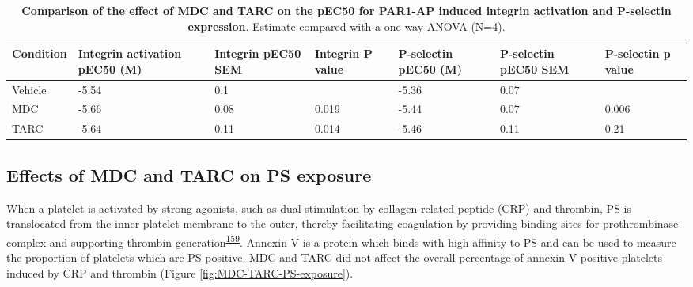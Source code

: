 \documentclass[11pt,twoside]{bristolthesis}
\begin{document}
\begin{table}

\caption[Comparison of the effect of MDC and TARC on the pEC50 for PAR1-AP induced integrin activation and P-selectin expression]{\label{tab:chemokines-integrin-pselectin}\textbf{Comparison of the effect of MDC and TARC on the pEC50 for PAR1-AP induced integrin activation and P-selectin expression}. Estimate compared with a one-way ANOVA (N=4).}
\centering
\fontsize{9}{11}\selectfont
\begin{tabu} to 
\toprule
Condition & Integrin activation pEC50 (M) & Integrin pEC50 SEM & Integrin P value & P-selectin pEC50 (M) & P-selectin pEC50 SEM & P-selectin p value\\
\midrule
Vehicle & -5.54 & 0.1 &  & -5.36 & 0.07 & \\
MDC & -5.66 & 0.08 & 0.019 & -5.44 & 0.07 & 0.006\\
TARC & -5.64 & 0.11 & 0.014 & -5.46 & 0.11 & 0.21\\
\bottomrule
\end{tabu}
\end{table}
\hypertarget{effects-of-mdc-and-tarc-on-ps-exposure}{%
\subsection{Effects of MDC and TARC on PS exposure}\label{effects-of-mdc-and-tarc-on-ps-exposure}}

When a platelet is activated by strong agonists, such as dual stimulation by collagen-related peptide (CRP) and thrombin, PS is translocated from the inner platelet membrane to the outer, thereby facilitating coagulation by providing binding sites for prothrombinase complex and supporting thrombin generation\textsuperscript{\protect\hyperlink{ref-Reddy2020}{159}}. Annexin V is a protein which binds with high affinity to PS and can be used to measure the proportion of platelets which are PS positive. MDC and TARC did not affect the overall percentage of annexin V positive platelets induced by CRP and thrombin (Figure \ref{fig:MDC-TARC-PS-exposure}).
\end{document}
